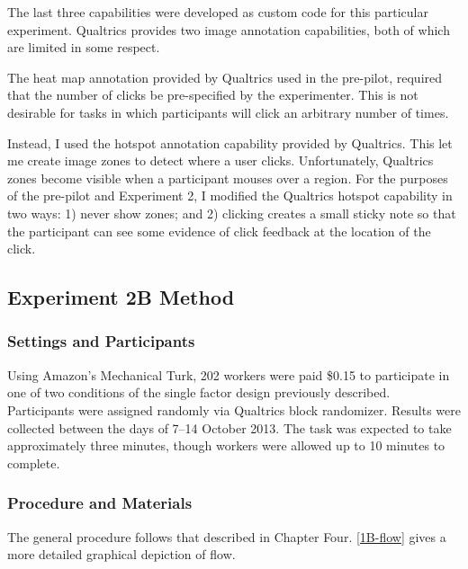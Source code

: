 The last three capabilities were developed as custom code for this particular experiment. Qualtrics provides two image annotation capabilities, both of which are limited in some respect. 

The heat map annotation provided by Qualtrics used in the pre-pilot, required that the number of clicks be pre-specified by the experimenter. This is not desirable for tasks in which participants will click an arbitrary number of times. 

Instead, I used the hotspot annotation capability provided by Qualtrics. This let me create image zones to detect where a user clicks. Unfortunately, Qualtrics zones become visible when a participant mouses over a region. For the purposes of the pre-pilot and Experiment 2, I modified the Qualtrics hotspot capability in two ways: 1) never show zones; and 2) clicking creates a small sticky note so that the participant can see some evidence of click feedback at the location of the click.

\subsection{Experiment 2B Method}
\label{experiment2bmethod}

\subsubsection{Settings and Participants}
\label{settingsandparticipants}

Using Amazon's Mechanical Turk, 202 workers were paid \$0.15 to participate in one of two conditions of the single factor design previously described. Participants were assigned randomly via Qualtrics block randomizer. Results were collected between the days of 7--14 October 2013. The task was expected to take approximately three minutes, though workers were allowed up to 10 minutes to complete.

\subsubsection{Procedure and Materials}
\label{procedureandmaterials}

The general procedure follows that described in Chapter Four.  \autoref{1B-flow}  gives a more detailed graphical depiction of flow.

